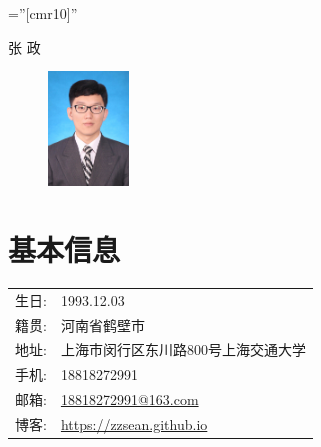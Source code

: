 \documentclass[a4paper,11pt]{article}
\begin{document}

\pagestyle{empty} %

\font\fb=''[cmr10]'' %

\par{
		\begin{center}{\Huge 张 \textsc{政}
	}\end{center}
\par}

\begin{figure} %
    \includegraphics[width=0.19\textwidth]{pic.jpg}
\end{figure}
\section{基本信息}
\begin{tabular}{rl}
  \textsc{生日:} & 1993.12.03 \\
  \textsc{籍贯:} & 河南省鹤壁市 \\
  \textsc{地址:}   &  上海市闵行区东川路800号上海交通大学\\
  \textsc{手机:}     & 18818272991\\
  \textsc{邮箱:}     & \href{mailto:18818272991@163.com}{18818272991@163.com}\\
  \textsc{博客:}     & \href{https://zzsean.github.io}{https://zzsean.github.io}\\
\end{tabular}
\end{document}
